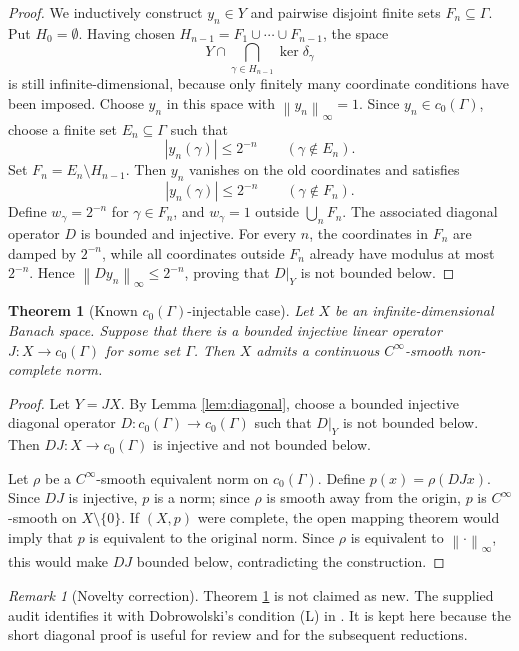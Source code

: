 \documentclass[11pt]{article}
\newtheorem{theorem}{Theorem}
\theoremstyle{remark}
\newtheorem{remark}{Remark}
\newcommand{\norm}[1]{\left\lVert #1 \right\rVert}
\begin{document}
\begin{proof}
We inductively construct \(y_n\in Y\) and pairwise disjoint finite sets
\(F_n\subseteq\Gamma\).  Put \(H_0=\emptyset\).  Having chosen
\(H_{n-1}=F_1\cup\cdots\cup F_{n-1}\), the space
\[
        Y\cap\bigcap_{\gamma\in H_{n-1}}\ker\delta_\gamma
\]
is still infinite-dimensional, because only finitely many coordinate
conditions have been imposed.  Choose \(y_n\) in this space with
\(\norm{y_n}_\infty=1\).  Since \(y_n\in c_0(\Gamma)\), choose a finite set
\(E_n\subseteq\Gamma\) such that
\[
        |y_n(\gamma)|\leq 2^{-n}\qquad(\gamma\notin E_n).
\]
Set \(F_n=E_n\setminus H_{n-1}\).  Then \(y_n\) vanishes on the old coordinates
and satisfies
\[
        |y_n(\gamma)|\leq 2^{-n}\qquad(\gamma\notin F_n).
\]
Define \(w_\gamma=2^{-n}\) for \(\gamma\in F_n\), and \(w_\gamma=1\) outside
\(\bigcup_n F_n\).  The associated diagonal operator \(D\) is bounded and
injective.  For every \(n\), the coordinates in \(F_n\) are damped by
\(2^{-n}\), while all coordinates outside \(F_n\) already have modulus at most
\(2^{-n}\).  Hence \(\norm{Dy_n}_\infty\leq 2^{-n}\), proving that \(D|_Y\)
is not bounded below.
\end{proof}

\begin{theorem}[Known \(c_0(\Gamma)\)-injectable case]
\label{thm:c0}
Let \(X\) be an infinite-dimensional Banach space.  Suppose that there is a
bounded injective linear operator \(J:X\to c_0(\Gamma)\) for some set
\(\Gamma\).  Then \(X\) admits a continuous \(C^\infty\)-smooth non-complete
norm.
\end{theorem}

\begin{proof}
Let \(Y=JX\).  By Lemma \ref{lem:diagonal}, choose a bounded injective
diagonal operator \(D:c_0(\Gamma)\to c_0(\Gamma)\) such that \(D|_Y\) is not
bounded below.  Then \(DJ:X\to c_0(\Gamma)\) is injective and not bounded
below.

Let \(\rho\) be a \(C^\infty\)-smooth equivalent norm on \(c_0(\Gamma)\).
Define \(p(x)=\rho(DJx)\).  Since \(DJ\) is injective, \(p\) is a norm; since
\(\rho\) is smooth away from the origin, \(p\) is \(C^\infty\)-smooth on
\(X\setminus\{0\}\).  If \((X,p)\) were complete, the open mapping theorem
would imply that \(p\) is equivalent to the original norm.  Since \(\rho\) is
equivalent to \(\norm{\cdot}_\infty\), this would make \(DJ\) bounded below,
contradicting the construction.
\end{proof}

\begin{remark}[Novelty correction]
Theorem \ref{thm:c0} is not claimed as new.  The supplied audit identifies it
with Dobrowolski's condition (L) in \cite[Proposition 5.1]{Dobrowolski1979}.
It is kept here because the short diagonal proof is useful for review and for
the subsequent reductions.
\end{remark}
\end{document}
